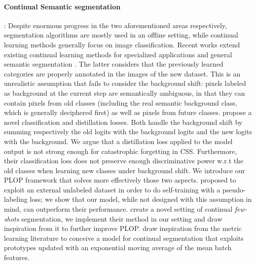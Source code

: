 \paragraph{Continual Semantic segmentation}: Despite enormous progress in the two aforementioned
areas respectively, segmentation algorithms are mostly used in an offline setting, while continual
learning methods generally focus on image classification. Recent works extend existing continual
learning methods \citep{li2018lwf,hou2019ucir} for specialized applications
\citep{ozdemir2018learnthenewkeeptheold,ozdemir2019segmentationanotomical,tasar19incrementsegmentationremotesensing}
and general semantic segmentation \citep{michieli2019ilt}. The latter considers that the previously
learned categories are properly annotated in the images of the new dataset. This is an unrealistic
assumption that fails to consider the background shift: pixels labeled as background at the current
step are semantically ambiguous, in that they can contain pixels from old classes (including the
real semantic background class, which is generally deciphered first) as well as pixels from future
classes. \citet{cermelli2020modelingthebackground} propose a novel classification and distillation
losses. Both handle the background shift by summing respectively the old logits with the background
logits and the new logits with the background. We argue that a distillation loss applied to the
model output is not strong enough for catastrophic forgetting in \ac{CSS}. Furthermore, their
classification loss does not preserve enough discriminative power w.r.t the old classes when
learning new classes under background shift. We introduce our PLOP framework that solves more
effectively those two aspects. \citet{yu2020continualsegmentationselftraining} proposed to exploit an
external unlabeled dataset in order to do self-training with a pseudo-labeling loss; we show that
our model, while not designed with this assumption in mind, can outperform their performance.
\citet{cermelli2020fewshotcontinualsegm} create a novel setting of continual \textit{few-shots}
segmentation, we implement their method in our setting and draw inspiration from it to further
improve PLOP. \citet{michieli2021sdr} draw inspiration from the metric learning literature to
conceive a model for continual segmentation that exploits prototypes updated with an exponential
moving average of the mean batch features.

